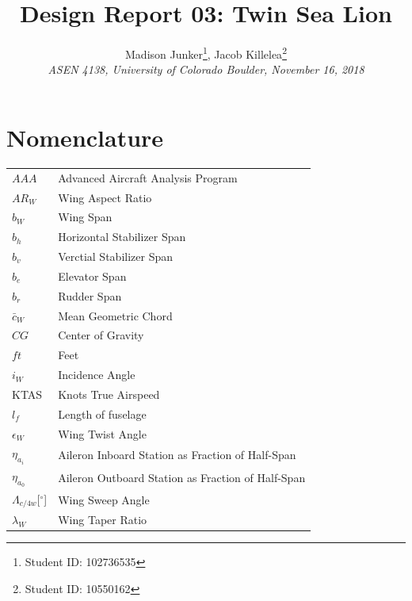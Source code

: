 \documentclass[conf]{new-aiaa}
\title{Design Report 03: Twin Sea Lion}
\author{
    Madison Junker\footnote{Student ID: 102736535 }, Jacob Killelea\footnote{Student ID: 10550162 } \\
    \emph{ASEN 4138, University of Colorado Boulder, November 16, 2018}
}
\begin{document}
\clearpage
\maketitle
\thispagestyle{empty}

\newpage
{}
\tableofcontents
{}
\listoffigures
{}
\listoftables
\newpage
\printnomenclature[25mm]

\section*{Nomenclature}

{\renewcommand\arraystretch{1.0}
\noindent\begin{longtable*}{@{}l @{\quad=\quad} l@{}}
$AAA$     	               & Advanced Aircraft Analysis Program \\
$AR_W$    	               & Wing Aspect Ratio          \\
$b_W$	  	               & Wing Span                  \\
$b_h$	  	               & Horizontal Stabilizer Span \\
$b_v$	  	               & Verctial Stabilizer Span   \\
$b_e$	  	               & Elevator Span   \\
$b_r$	  	               & Rudder Span   \\
$\bar{c}_W$	  	           & Mean Geometric Chord               \\
$CG$	  	               & Center of Gravity \\
$ft$	  	               & Feet \\
$i_W$		               & Incidence Angle                    \\
KTAS                       & Knots True Airspeed                \\
$l_f$     	               & Length of fuselage                 \\
$\epsilon_W$               & Wing Twist Angle                   \\
$\eta_{a_i}$               & Aileron Inboard Station as Fraction of Half-Span \\
$\eta_{a_0}$               & Aileron Outboard Station as Fraction of Half-Span \\
$\Lambda_{c/4w}$[$^\circ$] & Wing Sweep Angle                   \\
$\lambda_W$	               & Wing Taper Ratio                        \\

\end{longtable*}}
\end{document}
